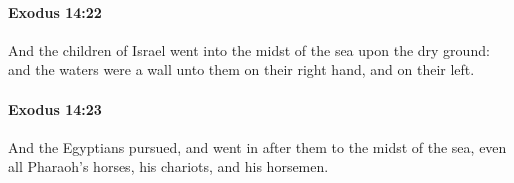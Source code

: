 		\paragraph{Exodus 14:22} %
			\label{EXODUS-14-22}

			And the children of Israel went into the midst of the sea upon the dry ground: and the waters were a wall unto them on their right hand, and on their left.


		\paragraph{Exodus 14:23} %
			\label{EXODUS-14-23}

			And the Egyptians pursued, and went in after them to the midst of the sea, even all Pharaoh's horses, his chariots, and his horsemen.



